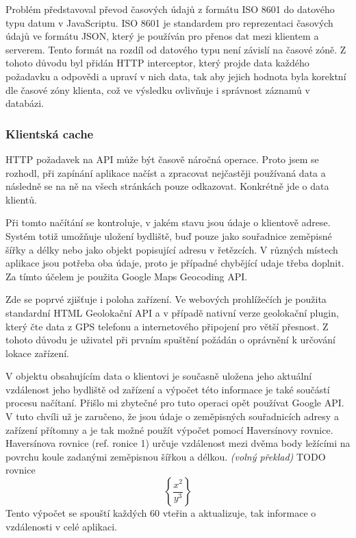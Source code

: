 \documentclass[
  biblatex,
  glossaries,
  index
]{kidiplom}
\begin{document}
Problém představoval převod časových údajů z formátu ISO 8601 do datového typu datum v JavaScriptu. ISO 8601 je standardem pro reprezentaci časových údajů ve formátu JSON, který je používán pro přenos dat mezi klientem a serverem. Tento formát na rozdíl od datového typu není závislí na časové zóně. Z tohoto důvodu byl přidán HTTP interceptor, který projde data každého požadavku a odpovědi a upraví v nich data, tak aby jejich hodnota byla korektní dle časové zóny klienta, což ve výsledku ovlivňuje i správnost záznamů v databázi.

\subsubsection{Klientská cache}
HTTP požadavek na API může být časově náročná operace. Proto jsem se rozhodl, při zapínání aplikace načíst a zpracovat nejčastěji používaná data a následně se na ně na všech stránkách pouze odkazovat. Konkrétně jde o data klientů. 

Při tomto načítání se kontroluje, v jakém stavu jsou údaje o klientově adrese. Systém totiž umožňuje uložení bydliště, buď pouze jako souřadnice zeměpisné šířky a délky nebo jako objekt popisující adresu v řetězcích. V různých místech aplikace jsou potřeba oba údaje, proto je případné chybějící udaje třeba doplnit. Za tímto účelem je použita Google Maps Geocoding API. 

Zde se poprvé zjišťuje i poloha zařízení. Ve webových prohlížečích je použita standardní HTML Geolokační API a v případě nativní verze geolokační plugin, který čte data z GPS telefonu a internetového připojení pro větší přesnost. Z tohoto důvodu je uživatel při prvním spuštění požádán o oprávnění k určování lokace zařízení.

V objektu obsahujícím data o klientovi je současně uložena jeho aktuální vzdálenost jeho bydliště od zařízení a výpočet této informace je také součástí procesu načítaní. Přišlo mi zbytečné pro tuto operaci opět používat Google API. V tuto chvíli už je zaručeno, že jsou údaje o zeměpisných souřadnicích adresy a zařízení přítomny a je tak možné použít výpočet pomocí Haversínovy rovnice. Haversínova rovnice (ref. ronice 1) určuje vzdálenost mezi dvěma body ležícími na povrchu koule zadanými zeměpisnou šířkou a délkou.\cite{12} \textit{(volný překlad)} TODO rovnice
$$\left\{\frac{x^2}{y^3}\right\}$$
 Tento výpočet se spouští každých 60 vteřin a aktualizuje, tak informace o vzdálenosti v celé aplikaci.


\end{document}
